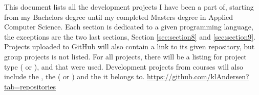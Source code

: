 \label{sec:introduction}


This document lists all the development projects I have been a part of, starting from my Bachelors degree until my completed Masters degree in Applied Computer Science. 
Each section is dedicated to a given programming language, the exceptions are the two last sections, Section \ref{sec:section8} and \ref{sec:section9}.
Projects uploaded to GitHub will also contain a link to its given repository, but group projects is not listed.
For all projects, there will be a listing for project type ( or ),  and  that were used. 
Development projects from courses will also include the , the  ( or ) and the  it belongs to.
\vspace{0.5em}\newline
{} \url{https://github.com/klAndersen?tab=repositories}
